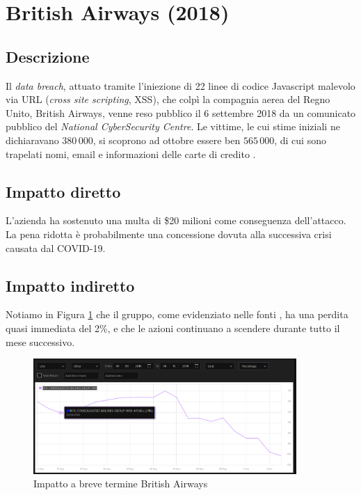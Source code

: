 \documentclass[12pt,a4paper,twoside]{report}
\begin{document}
\section{British Airways (2018)}
\subsection{Descrizione}
Il \textit{data breach}, attuato tramite l'iniezione di 22 linee di codice Javascript malevolo via URL (\textit{cross site scripting}, XSS), che colp\`i la compagnia aerea del Regno Unito, British Airways, venne reso pubblico il 6 settembre 2018 da un comunicato pubblico del \textit{National CyberSecurity Centre}. Le vittime, le cui stime iniziali ne dichiaravano $380\,000$, si scoprono ad ottobre essere ben $565\,000$, di cui sono trapelati nomi, email e informazioni delle carte di credito \cite{BritAir}.\\ 
\subsection{Impatto diretto}
L'azienda ha sostenuto una multa di \$20 milioni come conseguenza dell'attacco. \cite{BritAir} La pena ridotta \`e probabilmente una concessione dovuta alla successiva crisi causata dal COVID-19.\\
\subsection{Impatto indiretto}
Notiamo in Figura \ref{fig:britair1} \cite{lse_britair} che il gruppo, come evidenziato nelle fonti \cite{BritAir}, ha una perdita quasi immediata del 2\%, e che le azioni continuano a scendere durante tutto il mese successivo.

\begin{figure}[H] 
\begin{center} 
\includegraphics[width=10cm]{figures/britAir_short.png} 
\caption[Grafico British Airways short]{Impatto a breve termine British Airways}\label{fig:britair1}
\end{center}
\end{figure}
\end{document}

